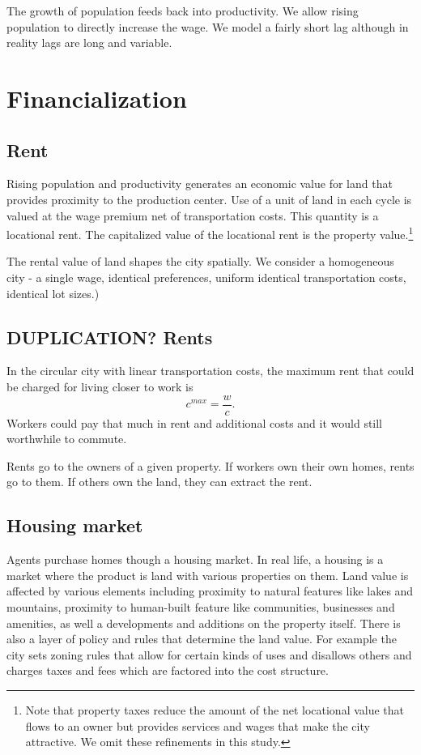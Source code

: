 The growth of population feeds back into productivity. We allow rising population to directly increase the wage.  We model a fairly short lag although in reality lags are long and variable. 

\section{Financialization}


\subsection{Rent}
Rising population and productivity generates an economic value for land that provides proximity to the production center. Use of a unit of land in each cycle is valued at the wage premium net of transportation costs. This quantity is a locational rent. The capitalized value of the locational rent is the property value.\footnote{Note that property taxes reduce the amount of the net locational value that flows to an owner but provides services and wages that make the city attractive. We omit these refinements in this study.}

The rental value of land shapes the city spatially.  We consider a homogeneous city - a single wage, identical preferences, uniform identical transportation costs, identical lot sizes.)

\subsection{DUPLICATION? Rents}
In the circular city with linear transportation costs, the maximum rent that could be charged for living closer to work is
 \[c^{max}= \frac{w}{{c}}.\]  
Workers could pay that much in rent and additional costs and it would still worthwhile to commute. 

Rents go to the owners of a given property. If workers own their own homes, rents go to them. If others own the land, they can extract the rent. %

\subsection{Housing market}

Agents purchase homes though a housing market.
In real life, a housing is a market where the product is land with various properties on them. Land value is affected by various elements including proximity to natural features like lakes and mountains, proximity to human-built feature like communities, businesses and amenities, as well a developments and additions on the property itself. 
There is also a layer of policy and rules that determine the land value. For example the city sets zoning rules that allow for certain kinds of uses and disallows others and charges taxes and fees which are factored into the cost structure.

